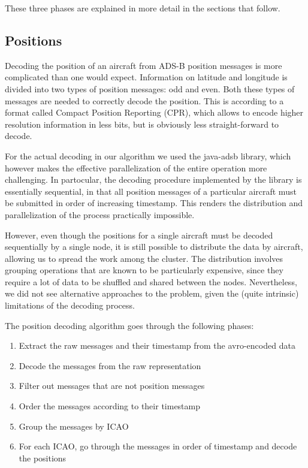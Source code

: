 \documentclass{vldb}
\begin{document}
These three phases are explained in more detail in the sections that follow.

\subsection{Positions}

Decoding the position of an aircraft from ADS-B position messages is more
complicated than one would expect. Information on latitude and longitude is
divided into two types of position messages: odd and even. Both these types of
messages are needed to correctly decode the position. This is according to a
format called Compact Position Reporting (CPR), which allows to encode higher
resolution information in less bits, but is obviously less straight-forward to
decode.

For the actual decoding in our algorithm we used the java-adsb library, which
however makes the effective parallelization of the entire operation more
challenging. In partocular, the decoding procedure implemented by the library is
essentially sequential, in that all position messages of a particular aircraft
must be submitted in order of increasing timestamp. This renders the
distribution and parallelization of the process practically impossible.

However, even though the positions for a single aircraft must be decoded
sequentially by a single node, it is still possible to distribute the data by
aircraft, allowing us to spread the work among the cluster. The distribution
involves grouping operations that are known to be particularly expensive, since
they require a lot of data to be shuffled and shared between the nodes.
Nevertheless, we did not see alternative approaches to the problem, given the
(quite intrinsic) limitations of the decoding process.

The position decoding algorithm goes through the following phases:

\begin{enumerate}
  \item Extract the raw messages and their timestamp from the avro-encoded data
  \item Decode the messages from the raw representation
  \item Filter out messages that are not position messages
  \item Order the messages according to their timestamp
  \item Group the messages by ICAO
  \item For each ICAO, go through the messages in order of timestamp and decode
  the positions
\end{enumerate}
\end{document}
